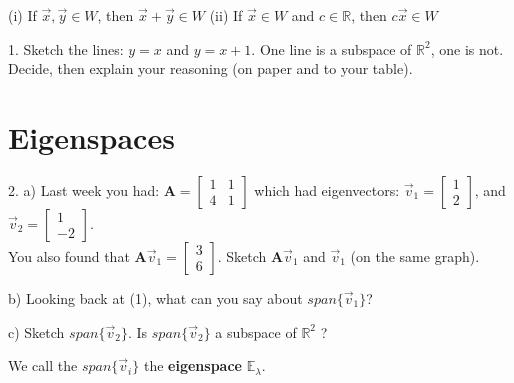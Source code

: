 \documentclass{article}
\begin{document}
\begin{flushleft}
(i) If $\vec{x},\vec{y}\in W$, then $\vec{x}+\vec{y}\in W$ \hspace{0.5in} (ii) If $\vec{x}\in W$ and $c\in \mathbb{R}$, then $c\vec{x} \in W$

\vspace{0.2in}

1. Sketch the lines: $y=x$ and $ y=x+1$.  One line is a subspace of $\mathbb{R}^2$, one is not. Decide, then explain your reasoning (on paper and to your table).

\vspace{1.5in}

\newpage

\section*{Eigenspaces}

2. a) Last week you had:
$\textbf{A}=
\begin{bmatrix} 
1 & 1 \\ 4&1 
\end{bmatrix}$
 which had eigenvectors:
$\vec{v}_1=\begin{bmatrix} 1 \\ 2 \end{bmatrix}$,
and $\vec{v}_2=\begin{bmatrix} 1 \\ -2 \end{bmatrix}$. \\
\hspace{0.12in} You also found that $\textbf{A}\vec{v}_1 = \begin{bmatrix} 3 \\ 6 \end{bmatrix}$. Sketch $\textbf{A}\vec{v}_1$ and $\vec{v}_1$ (on the same graph).

\vspace{2in}

\hspace{0.12in} b) Looking back at (1), what can you say about $span\{ \vec{v}_1 \}$? 

\vspace{1in}

\hspace{0.12in} c) Sketch $span\{ \vec{v}_2 \}$. Is $span\{ \vec{v}_2 \}$ a subspace of $\mathbb{R}^2$ ?   

\vspace{2in}

\large
We call the $span\{ \vec{v}_i \}$ the \textbf{eigenspace} $\mathbb{E}_{\lambda}$. \\
\normalsize


\end{flushleft}
\end{document}
